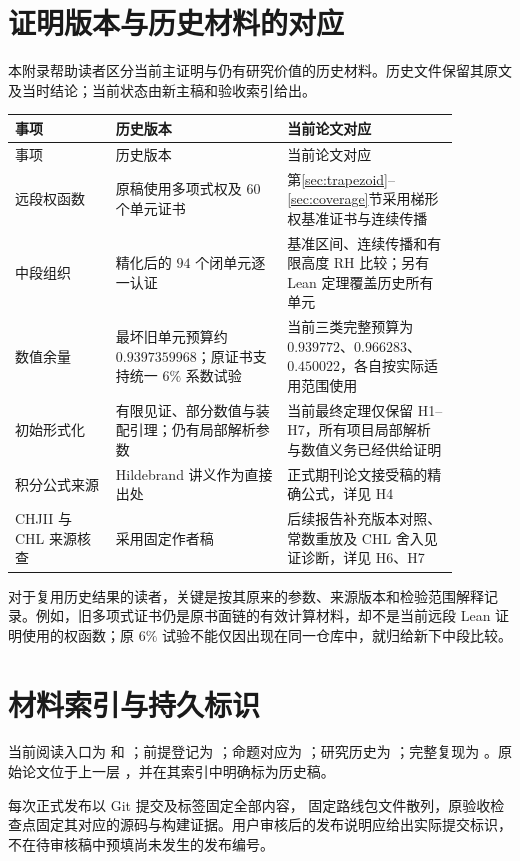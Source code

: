 \section{证明版本与历史材料的对应}\label{app:versions}

本附录帮助读者区分当前主证明与仍有研究价值的历史材料。历史文件保留其原文及当时结论；当前状态由新主稿和验收索引给出。

\begingroup\small
\begin{longtable}{p{0.20\linewidth}p{0.34\linewidth}p{0.34\linewidth}}
\toprule
事项 & 历史版本 & 当前论文对应\\
\midrule\endfirsthead
\toprule 事项 & 历史版本 & 当前论文对应\\\midrule\endhead
远段权函数 & 原稿使用多项式权及 $60$ 个单元证书 & 第\ref{sec:trapezoid}--\ref{sec:coverage}节采用梯形权基准证书与连续传播\\
中段组织 & 精化后的 $94$ 个闭单元逐一认证 & 基准区间、连续传播和有限高度 RH 比较；另有 Lean 定理覆盖历史所有单元\\
数值余量 & 最坏旧单元预算约 $0.9397359968$；原证书支持统一 $6\%$ 系数试验 & 当前三类完整预算为 $0.939772$、$0.966283$、$0.450022$，各自按实际适用范围使用\\
初始形式化 & 有限见证、部分数值与装配引理；仍有局部解析参数 & 当前最终定理仅保留 H1--H7，所有项目局部解析与数值义务已经供给证明\\
积分公式来源 & Hildebrand 讲义作为直接出处 & 正式期刊论文接受稿的精确公式，详见 H4\\
CHJII 与 CHL 来源核查 & 采用固定作者稿 & 后续报告补充版本对照、常数重放及 CHL 舍入见证诊断，详见 H6、H7\\
\bottomrule
\end{longtable}\endgroup

对于复用历史结果的读者，关键是按其原来的参数、来源版本和检验范围解释记录。例如，旧多项式证书仍是原书面链的有效计算材料，却不是当前远段 Lean 证明使用的权函数；原 $6\%$ 试验不能仅因出现在同一仓库中，就归给新下中段比较。

\section{材料索引与持久标识}
当前阅读入口为  和 ；前提登记为 ；命题对应为 ；研究历史为 ；完整复现为 。原始论文位于上一层 ，并在其索引中明确标为历史稿。

每次正式发布以 Git 提交及标签固定全部内容， 固定路线包文件散列，原验收检查点固定其对应的源码与构建证据。用户审核后的发布说明应给出实际提交标识，不在待审核稿中预填尚未发生的发布编号。
